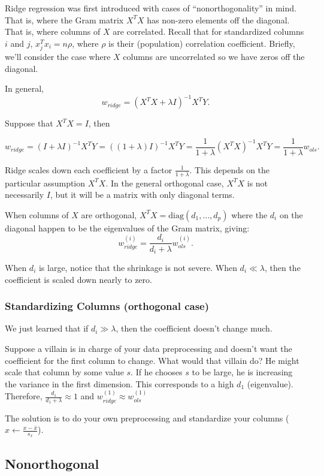 Ridge regression was first introduced with cases of ``nonorthogonality'' in mind. That is, where the Gram matrix $X^T X$ has non-zero elements off the diagonal. That is, where columns of $X$ are correlated.
Recall that for standardized columns $i$ and $j$, $x_j^T x_i = n\rho$, where $\rho$ is their (population) correlation coefficient.  Briefly, we'll consider the case where $X$ columns are uncorrelated so we have zeros off the diagonal. 


In general, $$w_{ridge} = (X^T X + \lambda I)^{-1} X^T Y.$$

Suppose that $X^T X = I$, then

$$w_{ridge} = (I + \lambda I)^{-1} X^T Y = ((1+\lambda)I)^{-1}X^T Y = \frac{1}{1+\lambda} (X^T X)^{-1} X^T Y= \frac{1}{1+\lambda} w_{ols}.$$

Ridge scales down each coefficient by a factor $\frac{1}{1+\lambda}$. This depends on the particular assumption $X^TX$. In the general orthogonal case, $X^TX$ is not necessarily $I$, but it will be a matrix with only diagonal terms. 

When columns of $X$ are orthogonal, $X^TX = \text{diag}(d_1, \ldots, d_p)$ where the $d_i$ on the diagonal happen to be the eigenvalues of the Gram matrix, giving:
$$w_{ridge}^{(i)} = \frac{d_i}{d_i + \lambda} w_{ols}^{(i)}.$$

When $d_i$ is large, notice that the shrinkage is not severe. When $d_i \ll \lambda$, then the coefficient is scaled down nearly to zero. 

\subsubsection{Standardizing Columns (orthogonal case)}

We just learned that if $d_i \gg \lambda$, then the coefficient doesn't change much.

Suppose a villain is in charge of your data preprocessing and doesn't want the coefficient for the first column to change. What would that villain do? He might scale that column by some value $s$. If he chooses $s$ to be large, 
he is increasing the variance in the first dimension. This corresponds to a high $d_1$ (eigenvalue). Therefore, $\frac{d_1}{d_1 + \lambda} \approx 1$ and $w_{ridge}^{(1)} \approx w_{ols}^{(1)}$


The solution is to do your own preprocessing and standardize your columns ($x\leftarrow \frac{x-\bar{x}}{s_x}$).


\subsection{Nonorthogonal}

